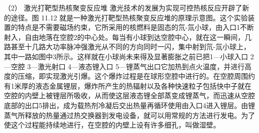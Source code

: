 （2） 激光打靶型热核聚变反应堆
激光技术的发展为实现可控热核反应开辟了新的途径。图 11.12
就是一种激光打靶型热核聚变反应堆的原理示意图。这个实验装置的特点是不需要磁场约束，它所采用的核燃料是固态的氘-氚小球，由入口1不断射入，自由地落在空腔2的中心处。每当有小球到达空腔中心，就在这一瞬间，几路甚至十几路大功率脉冲强激光从不同的方向同时一闪，集中射到氘-氚小球上，其中一路如图中3所示。这样就在小球尚未来得及显著膨胀之前已把1---小球入口
2---空腔 3---激光射口 4---液态锂入口
5---锂蒸气出口它加热到点火温度，并进行高度的压缩，即实现激光引爆。这个爆炸过程是在球形空腔中进行的。在空腔周围约有1米厚的液态金属锂层，爆炸所产生的热辐射以及各种快速粒子包括快中子就在空腔的内壁上被锂层所吸收，从而使这层液态锂全部蒸变成锂蒸气，而迅速从空腔底部的出口5排出，成为载热剂冷凝后交出热量再循环使用由入口4进入锂层。由锂蒸气所释放的热量通过热交换器到发电设备，就可以用常规的方法进行发电。为了使这个过程能持续地进行，在空腔的内壁上设有许多细孔，叫做湿壁。

